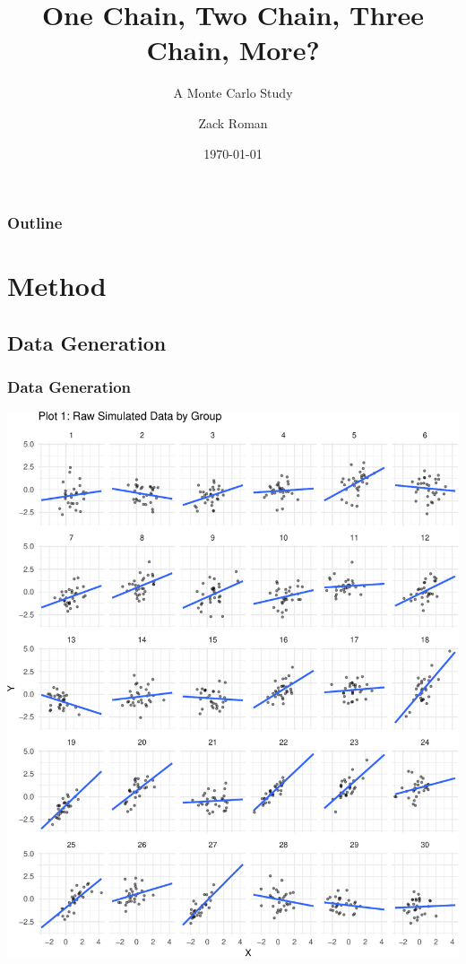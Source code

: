 \documentclass{beamer}
\begin{document}
	\title{One Chain, Two Chain, Three Chain, More?}
	\subtitle{A Monte Carlo Study}
	\author{Zack Roman}
	\date{\today}
	
\begin{frame}
	
	\titlepage
	
\end{frame}

\begin{frame}
	\frametitle{Outline}
	\tableofcontents
\end{frame}



\section{Method}
\subsection{Data Generation}

\begin{frame}
\frametitle{Data Generation}
\includegraphics[scale=.35]{Raw_slopes.pdf}
\end{frame}
\end{document}
